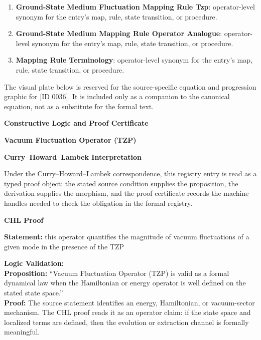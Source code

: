 \begingroup\footnotesize\sloppy
\begin{enumerate}[leftmargin=1.35em,itemsep=1pt,topsep=1pt,parsep=0pt]
\item \textbf{Ground-State Medium Fluctuation Mapping Rule Tzp}: operator-level synonym for the entry's map, rule, state transition, or procedure.
\item \textbf{Ground-State Medium Mapping Rule Operator Analogue}: operator-level synonym for the entry's map, rule, state transition, or procedure.
\item \textbf{Mapping Rule Terminology}: operator-level synonym for the entry's map, rule, state transition, or procedure.
\end{enumerate}
\endgroup

\begingroup\footnotesize\sloppy
The visual plate below is reserved for the source-specific equation and progression graphic for [ID 0036]. It is included only as a companion to the canonical equation, not as a substitute for the formal text.
\par\endgroup
\ifTZPDarkEdition
{}
\fi

\clearpage
\begingroup\tzpsupportsetup
\noindent\textbf{\fontsize{10.8pt}{12.8pt}\selectfont [ID 0036] Constructive Logic and Proof Certificate}\par
\noindent\textbf{\fontsize{10pt}{12pt}\selectfont Vacuum Fluctuation Operator (TZP)}\par
\vspace{0.45em}
\begingroup
\footnotesize
\setlength{\parskip}{0.22em}
\setlength{\parindent}{0pt}
\noindent\textbf{Curry--Howard--Lambek Interpretation}\par
Under the Curry--Howard--Lambek correspondence, this registry entry is read as a typed proof
object: the stated source condition supplies the proposition, the derivation supplies the
morphism, and the proof certificate records the machine handles needed to check the obligation
in the formal registry.

\vspace{0.45em}
\noindent\textbf{CHL Proof}\par
\textbf{Statement:} this operator quantifies the magnitude of vacuum fluctuations of a given mode in the
presence of the TZP

\textbf{Logic Validation:}\\
\textbf{Proposition:} ``Vacuum Fluctuation Operator (TZP) is valid as a formal dynamical law when the
Hamiltonian or energy operator is well defined on the stated state space.''\\
\textbf{Proof:} The source statement identifies an energy, Hamiltonian, or vacuum-sector mechanism. The
CHL proof reads it as an operator claim: if the state space and localized terms are
defined, then the evolution or extraction channel is formally meaningful.

